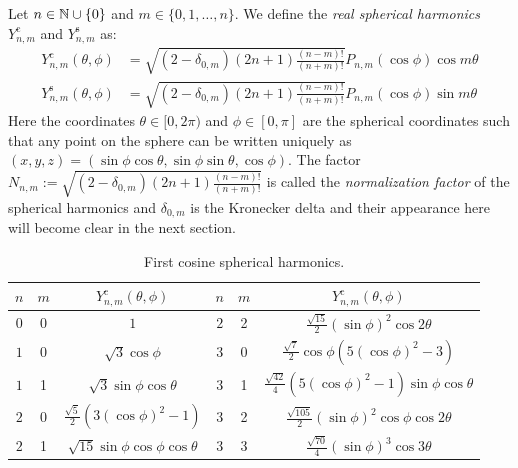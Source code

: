 \documentclass[../main.tex]{subfiles}
\begin{document}
\begin{definition}
  Let $n\in\mathbb{N}\cup\{0\}$ and $m\in\{0,1,\dots,n\}$. We define the \emph{real spherical harmonics} $Y_{n,m}^{\mathrm{c}}$ and $Y_{n,m}^{\mathrm{s}}$ as:
  \begin{align}
    Y_{n,m}^{\mathrm{c}}(\theta,\phi) & =\sqrt{(2-\delta_{0,m})(2n+1)\frac{(n-m)!}{(n+m)!} }P_{n,m}(\cos\phi) \cos{m\theta} \\
    Y_{n,m}^{\mathrm{s}}(\theta,\phi) & =\sqrt{(2-\delta_{0,m})(2n+1)\frac{(n-m)!}{(n+m)!} }P_{n,m}(\cos\phi) \sin{m\theta}
  \end{align}
  Here the coordinates $\theta\in [0,2\pi)$ and $\phi\in[0,\pi]$ are the spherical coordinates such that any point on the sphere can be written uniquely as $(x,y,z) = (\sin\phi\cos\theta,\sin\phi\sin\theta,\cos\phi)$. The factor $N_{n,m}:=\sqrt{(2-\delta_{0,m})(2n+1)\frac{(n-m)!}{(n+m)!} }$ is called the \emph{normalization factor} of the spherical harmonics and $\delta_{0,m}$ is the Kronecker delta and their appearance here will become clear in the next section.
\end{definition}
\begin{table}[ht]
  \centering
  \begin{tabular}{|c|c|c||c|c|c|}
    \hline
    $n$ & $m$ & $Y_{n,m}^{\mathrm{c}}(\theta,\phi)$     & $n$ & $m$ & $Y_{n,m}^{\mathrm{c}}(\theta,\phi)$                        \\
    \hline
    $0$ & 0   & $1$                                     & $2$ & 2   & $\frac{\sqrt{15}}{2}{(\sin\phi)}^2\cos 2\theta$            \\
    $1$ & 0   & $\sqrt{3}\cos\phi$                      & $3$ & 0   & $\frac{\sqrt{7}}{2}\cos\phi(5{(\cos\phi)}^2-3)$            \\
    $1$ & 1   & $\sqrt{3}\sin\phi\cos\theta$            & $3$ & 1   & $\frac{\sqrt{42}}{4}(5{(\cos\phi)}^2-1)\sin\phi\cos\theta$ \\
    $2$ & 0   & $\frac{\sqrt{5}}{2}(3{(\cos\phi)}^2-1)$ & $3$ & 2   & $\frac{\sqrt{105}}{2}{(\sin\phi)}^2\cos\phi\cos 2\theta$   \\
    $2$ & 1   & $\sqrt{15}\sin\phi\cos\phi\cos\theta$   & $3$ & 3   & $\frac{\sqrt{70}}{4}{(\sin\phi)}^3\cos 3\theta$            \\
    \hline
  \end{tabular}
  \caption{First cosine spherical harmonics.}
\end{table}
\end{document}
